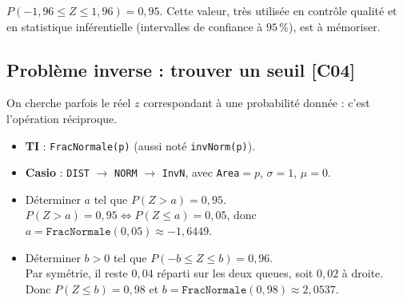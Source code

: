 \documentclass[a4paper,11pt]{article}
\newcommand{\gaussN}[1]{1/sqrt(2*pi)*exp(-((#1)^2)/2)}
\begin{document}
\begin{center}
\end{center}

\begin{remarque}
$P(-1{,}96 \leq Z \leq 1{,}96) = 0{,}95$. Cette valeur, très utilisée en contrôle qualité et en statistique inférentielle (intervalles de confiance à $95\,\%$), est à mémoriser.
\end{remarque}

\subsection{Problème inverse : trouver un seuil \hfill {\normalsize\color{uimmred}[C04]}}

On cherche parfois le réel $z$ correspondant à une probabilité donnée : c'est l'opération réciproque.

\begin{calculatrice}[-- Trouver $z$ tel que $P(Z \leq z) = p$]
\begin{itemize}
  \item \textbf{TI} : \texttt{FracNormale(p)} (aussi noté \texttt{invNorm(p)}).
  \item \textbf{Casio} : \texttt{DIST} $\rightarrow$ \texttt{NORM} $\rightarrow$ \texttt{InvN}, avec \texttt{Area}$=p$, $\sigma=1$, $\mu=0$.
\end{itemize}
\end{calculatrice}

\begin{exemple}
\begin{itemize}
  \item Déterminer $a$ tel que $P(Z > a) = 0{,}95$. \\
  $P(Z > a) = 0{,}95 \iff P(Z \leq a) = 0{,}05$, donc $a = \texttt{FracNormale}(0{,}05) \approx -1{,}6449$.
  \item Déterminer $b > 0$ tel que $P(-b \leq Z \leq b) = 0{,}96$. \\
  Par symétrie, il reste $0{,}04$ réparti sur les deux queues, soit $0{,}02$ à droite. Donc $P(Z \leq b) = 0{,}98$ et $b = \texttt{FracNormale}(0{,}98) \approx 2{,}0537$.
\end{itemize}
\end{exemple}
\end{document}
